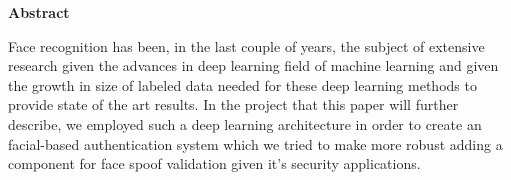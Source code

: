 \thispagestyle{plain}

\vspace*{\fill}

\begin{center}
	\Large \textbf{Abstract}	
\end{center}

Face recognition has been, in the last couple of years, the subject of extensive research given the advances in deep learning field of machine learning and given the growth in size of labeled data needed for these deep learning methods to provide state of the art results. In the project that this paper will further describe, we employed such a deep learning architecture in order to create an facial-based authentication system which we tried to make more robust adding a component for face spoof validation given it's security applications.

\vspace*{\fill}
